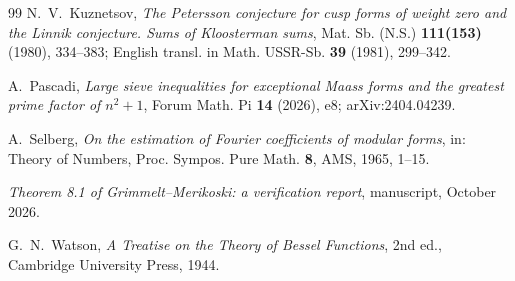 \documentclass[11pt]{amsart}
\theoremstyle{remark}
\theoremstyle{definition}
\numberwithin{equation}{section}
\begin{document}
\begin{thebibliography}{99}
 N.~V.~Kuznetsov, \emph{The Petersson conjecture for cusp forms of weight zero and the Linnik conjecture. Sums of Kloosterman sums}, Mat. Sb. (N.S.) \textbf{111(153)} (1980), 334--383; English transl. in Math. USSR-Sb. \textbf{39} (1981), 299--342.

 A.~Pascadi, \emph{Large sieve inequalities for exceptional Maass forms and the greatest prime factor of $n^2+1$}, Forum Math. Pi \textbf{14} (2026), e8; arXiv:2404.04239.

 A.~Selberg, \emph{On the estimation of Fourier coefficients of modular forms}, in: Theory of Numbers, Proc. Sympos. Pure Math. \textbf{8}, AMS, 1965, 1--15.

 \emph{Theorem 8.1 of Grimmelt--Merikoski: a verification report}, manuscript, October 2026.

 G.~N.~Watson, \emph{A Treatise on the Theory of Bessel Functions}, 2nd ed., Cambridge University Press, 1944.

\end{thebibliography}
\end{document}
